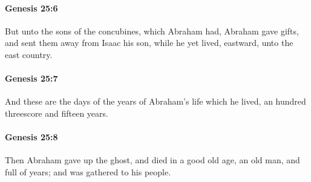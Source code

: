		\paragraph{Genesis 25:6} %
			\label{GENESIS-25-6}

			But unto the sons of the concubines, which Abraham had, Abraham gave gifts, and sent them away from Isaac his son, while he yet lived, eastward, unto the east country.


		\paragraph{Genesis 25:7} %
			\label{GENESIS-25-7}

			And these are the days of the years of Abraham's life which he lived, an hundred threescore and fifteen years.


		\paragraph{Genesis 25:8} %
			\label{GENESIS-25-8}

			Then Abraham gave up the ghost, and died in a good old age, an old man, and full of years; and was gathered to his people.


